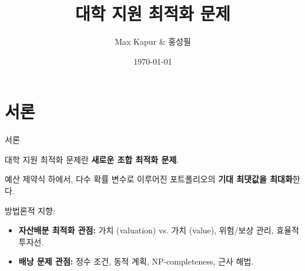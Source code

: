 \documentclass[10pt,slidestop,compress,mathserif,notheorems]{beamer}
\newif\ifen
\theoremstyle{definition}
\theoremstyle{definition}
\begin{document}
\ifen 
\title[College Application]{The College Application Problem}
\author{Max Kapur and Sung-Pil Hong}
\institute{Seoul National University\\
Department of Industrial Engineering \\
Management Science/Optimization Lab}
\date{\today}
\else
\title[대학 지원 최적화 문제]{대학 지원 최적화 문제}
\author{Max Kapur \& 홍성필}
\date{\today}
\fi


\begin{frame}
\titlepage
\end{frame}




\section{\ifen Introduction\else 서론 \fi}
\begin{frame}{\ifen Introduction\else 서론 \fi}
\ifen {
The optimal college application problem is a \textbf{novel combinatorial optimization problem}.

\textbf{Maximize the expected maximum} of a portfolio of random variables subject to a budget constraint.

Our methodological orientation:
\begin{itemize}
\item \textbf{Asset allocation perspective:} Valuation vs. value, inherent risk/reward tradeoff, efficient frontier.
\item \textbf{Knapsack perspective:} Integrality constraint, dynamic programming solutions, NP-completeness, approximation algorithms.
\end{itemize}
} \else {
대학 지원 최적화 문제란 \textbf{새로운 조합 최적화 문제}.

예산 제약식 하에서, 다수 확률 변수로 이루어진 포트폴리오의 \textbf{기대 최댓값을 최대화}한다.

방법론적 지향:
\begin{itemize}
\item \textbf{자산배분 최적화 관점:} 가치 (valuation) vs. 가치 (value), 위험/보상 관리, 효율적 투자선.
\item \textbf{배낭 문제 관점:} 정수 조건, 동적 계획, NP-completeness, 근사 해법.
\end{itemize}
} \fi
\end{frame}
\end{document}
